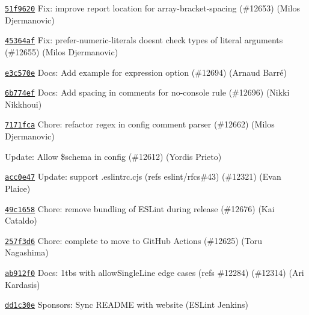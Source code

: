\begin{DoxyItemize}
\item \href{https://github.com/eslint/eslint/commit/51f9620cc55cc091fe38dbe68e4633de06297b8c}{\texttt{ {\ttfamily 51f9620}}} Fix\+: improve report location for array-\/bracket-\/spacing (\#12653) (Milos Djermanovic)
\item \href{https://github.com/eslint/eslint/commit/45364afc9c7f0251348cd1a7a13656c3816435d7}{\texttt{ {\ttfamily 45364af}}} Fix\+: prefer-\/numeric-\/literals doesn\textquotesingle{}t check types of literal arguments (\#12655) (Milos Djermanovic)
\item \href{https://github.com/eslint/eslint/commit/e3c570eaf3d1d44fb57bf42f1870887856e4c5a0}{\texttt{ {\ttfamily e3c570e}}} Docs\+: Add example for expression option (\#12694) (Arnaud Barré)
\item \href{https://github.com/eslint/eslint/commit/6b774ef0d849ccf5c1127b25e1fe7c3e438d586b}{\texttt{ {\ttfamily 6b774ef}}} Docs\+: Add spacing in comments for no-\/console rule (\#12696) (Nikki Nikkhoui)
\item \href{https://github.com/eslint/eslint/commit/7171fca6ef4e0e8f267658fc7d8f603f00eddd84}{\texttt{ {\ttfamily 7171fca}}} Chore\+: refactor regex in config comment parser (\#12662) (Milos Djermanovic)
\item \href{https://github.com/eslint/eslint/commit/1600648d2880ffb1e9e414b31ff0f66ead7167f9}{\texttt{ {}}} Update\+: Allow \$schema in config (\#12612) (Yordis Prieto)
\item \href{https://github.com/eslint/eslint/commit/acc0e47572a9390292b4e313b4a4bf360d236358}{\texttt{ {\ttfamily acc0e47}}} Update\+: support .eslintrc.\+cjs (refs eslint/rfcs\#43) (\#12321) (Evan Plaice)
\item \href{https://github.com/eslint/eslint/commit/49c1658544ace24b9aaaa301af0fc07a2ef3bf30}{\texttt{ {\ttfamily 49c1658}}} Chore\+: remove bundling of E\+S\+Lint during release (\#12676) (Kai Cataldo)
\item \href{https://github.com/eslint/eslint/commit/257f3d67905a52bf8602a5a5707c893cc90d7ca7}{\texttt{ {\ttfamily 257f3d6}}} Chore\+: complete to move to Git\+Hub Actions (\#12625) (Toru Nagashima)
\item \href{https://github.com/eslint/eslint/commit/ab912f0ef709a916ab9a27ea09d9d7adf046fb2d}{\texttt{ {\ttfamily ab912f0}}} Docs\+: 1tbs with allow\+Single\+Line edge cases (refs \#12284) (\#12314) (Ari Kardasis)
\item \href{https://github.com/eslint/eslint/commit/dd1c30e35f05ed332e2abbd3d4d53635efde74b8}{\texttt{ {\ttfamily dd1c30e}}} Sponsors\+: Sync R\+E\+A\+D\+ME with website (E\+S\+Lint Jenkins)

\end{DoxyItemize}
